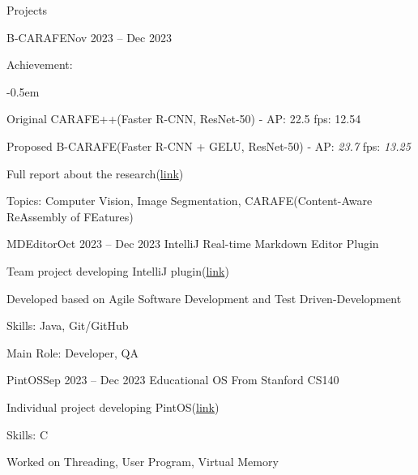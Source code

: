 \documentclass{resume}
\begin{document}
\begin{rSection}{Projects}
\begin{rSubsection}{B-CARAFE}{Nov 2023 -- Dec 2023}
        \item Achievement:
        \vspace{-0.5em}
        \begin{list}{--}{\setlength{\rightmargin}{1.5em}}
            \itemsep -0.5em

            \item Original CARAFE++(Faster R-CNN, ResNet-50) - AP: 22.5 fps: 12.54
            
            \item Proposed B-CARAFE(Faster R-CNN + GELU, ResNet-50) - AP: \emph{23.7} fps: \emph{13.25}
        \end{list}

        \item Full report about the research(\href{https://github.com/minsusun/csed539/blob/main/main.pdf}{link})

        \item Topics: Computer Vision, Image Segmentation, CARAFE(Content-Aware ReAssembly of FEatures)
    \end{rSubsection}

    \begin{rSubsection}{MDEditor}{Oct 2023 -- Dec 2023}
        IntelliJ Real-time Markdown Editor Plugin

        \item Team project developing IntelliJ plugin(\href{https://github.com/minsusun/csed332-project}{link})

        \item Developed based on Agile Software Development and Test Driven-Development

        \item Skills: Java, Git/GitHub

        \item Main Role: Developer, QA
    \end{rSubsection}

    \begin{rSubsection}{PintOS}{Sep 2023 -- Dec 2023}
        Educational OS From Stanford CS140

        \item Individual project developing PintOS(\href{https://github.com/minsusun/csed312-pintos}{link})

        \item Skills: C

        \item Worked on Threading, User Program, Virtual Memory
    \end{rSubsection}


\end{rSection}
\end{document}
